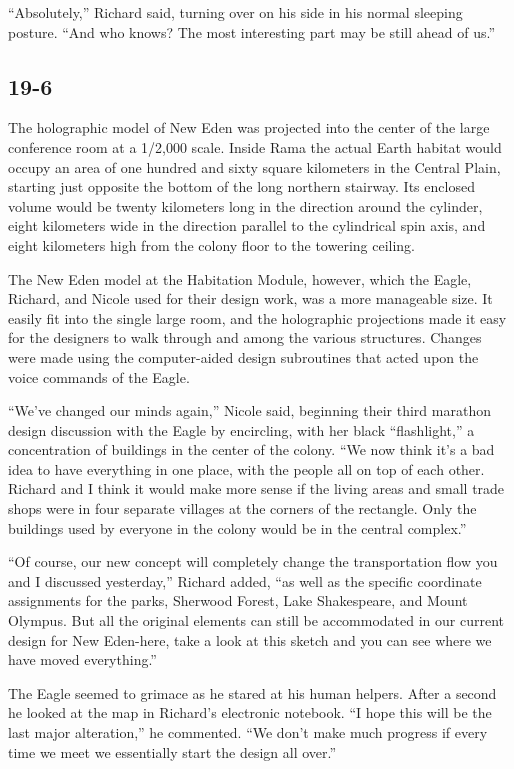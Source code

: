 \documentclass[]{article}
\begin{document}
{“Absolutely,” Richard said, turning over on his side in his normal sleeping posture.  “And who knows? The most interesting part may be still ahead of us.”

\subsection*{19-6}

The holographic model of New Eden was projected into the center of the large conference room at a 1/2,000 scale.  Inside Rama the actual Earth habitat would occupy an area of one hundred and sixty square kilometers in the Central Plain, starting just opposite the bottom of the long northern stairway.  Its enclosed volume would be twenty kilometers long in the direction around the cylinder, eight kilometers wide in the direction parallel to the cylindrical spin axis, and eight kilometers high from the colony floor to the towering ceiling.

The New Eden model at the Habitation Module, however, which the Eagle, Richard, and Nicole used for their design work, was a more manageable size.  It easily fit into the single large room, and the holographic projections made it easy for the designers to walk through and among the various structures.  Changes were made using the computer-aided design subroutines that acted upon the voice commands of the Eagle.

“We’ve changed our minds again,” Nicole said, beginning their third marathon design discussion with the Eagle by encircling, with her black “flashlight,” a concentration of buildings in the center of the colony.  “We now think it’s a bad idea to have everything in one place, with the people all on top of each other.  Richard and I think it would make more sense if the living areas and small trade shops were in four separate villages at the corners of the rectangle.  Only the buildings used by everyone in the colony would be in the central complex.”

“Of course, our new concept will completely change the transportation flow you and I discussed yesterday,” Richard added, “as well as the specific coordinate assignments for the parks, Sherwood Forest, Lake Shakespeare, and Mount Olympus.  But all the original elements can still be accommodated in our current design for New Eden-here, take a look at this sketch and you can see where we have moved everything.”

The Eagle seemed to grimace as he stared at his human helpers.  After a second he looked at the map in Richard’s electronic notebook.  “I hope this will be the last major alteration,” he commented.  “We don’t make much progress if every time we meet we essentially start the design all over.”

}
\end{document}
